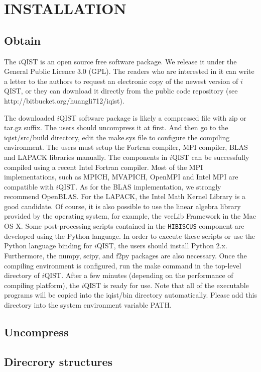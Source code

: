 \chapter{INSTALLATION}
\section{Obtain}

The $i$QIST is an open source free software package. We release it under the General Public Licence 3.0 (GPL). The readers who are interested in it can write a letter to the authors to request an electronic copy of the newest version of $i$QIST, or they can download it directly from the public code repository (see http://bitbucket.org/huangli712/iqist). 

The downloaded $i$QIST software package is likely a compressed file with zip or tar.gz suffix. The users should uncompress it at first. And then go to the iqist/src/build directory, edit the make.sys file to configure the compiling environment. The users must setup the Fortran compiler, MPI compiler, BLAS and LAPACK libraries manually. The components in $i$QIST can be successfully compiled using a recent Intel Fortran compiler. Most of the MPI implementations, such as MPICH, MVAPICH, OpenMPI and Intel MPI are compatible with $i$QIST. As for the BLAS implementation, we strongly recommend OpenBLAS. For the LAPACK, the Intel Math Kernel Library is a good candidate. Of course, it is also possible to use the linear algebra library provided by the operating system, for example, the vecLib Framework in the Mac OS X. Some post-processing scripts contained in the \texttt{HIBISCUS} component are developed using the Python language. In order to execute these scripts or use the Python language binding for $i$QIST, the users should install Python 2.x.  Furthermore, the numpy, scipy, and f2py packages are also necessary. Once the compiling environment is configured, run the make command in the top-level directory of $i$QIST. After a few minutes (depending on the performance of compiling platform), the $i$QIST is ready for use. Note that all of the executable programs will be copied into the iqist/bin directory automatically. Please add this directory into the system environment variable PATH.

\section{Uncompress}
\section{Direcrory structures}
